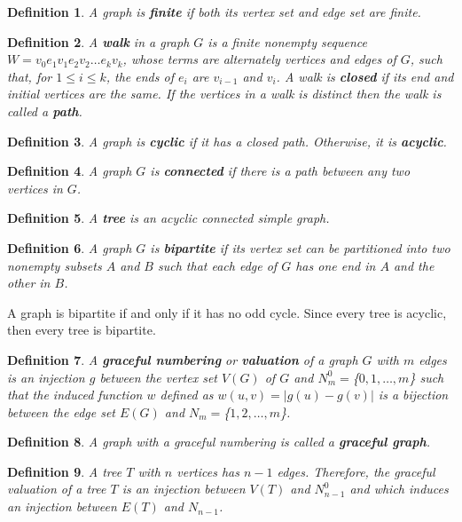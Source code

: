 \documentclass[a4paper, 11pt]{article}
\newtheorem{define}{Definition}
\begin{document}
\begin{define} A graph is \textbf{finite} if both its vertex set and edge set are finite.
\end{define}

\begin{define}
    A \textbf{walk} in a graph $G$ is a finite nonempty sequence $W=v_0 e_1 v_1 e_2 v_2 \dots e_k v_k$, whose terms are alternately vertices and edges of $G$, such that, for $1\leq i\leq k$, the ends of $e_i$ are $v_{i-1}$ and $v_i$. A walk is \textbf{closed} if its end and initial vertices are the same. If the vertices in a walk is distinct then the walk is called a \textbf{path}.
\end{define}

\begin{define} A graph is \textbf{cyclic} if it has a closed path. Otherwise, it is \textbf{acyclic}.
\end{define}

\begin{define} A graph $G$ is \textbf{connected} if there is a path between any two vertices in $G$.
\end{define}

\begin{define} A \textbf{tree} is an acyclic connected simple graph. 
\end{define}

\begin{define} A graph $G$ is \textbf{bipartite} if its vertex set can be partitioned into two nonempty subsets $A$ and $B$ such that each edge of $G$ has one end in $A$ and the other in $B$.
\end{define}
\indent
\indent A graph is bipartite if and only if it has no odd cycle. Since every tree is acyclic, then every tree is bipartite.


\begin{define} A \textbf{graceful numbering} or \textbf{valuation} of a graph $G$ with $m$ edges is an injection $g$ between the vertex set $V(G)$ of $G$ and $N_m^0=$\{$0,1,\dots,m$\} such that the induced function $w$ defined as $w(u,v)=|g(u)-g(v)|$ is a bijection between the edge set $E(G)$ and $N_m=$\{$1,2,\dots,m$\}.
\end{define}

\begin{define} A graph with a graceful numbering is called a \textbf{graceful graph}.
\end{define}

\begin{define} A tree $T$ with $n$ vertices has $n-1$ edges. Therefore, the graceful valuation of a tree $T$ is an injection between $V(T)$ and $N_{n-1}^0$ and which induces an injection between $E(T)$ and $N_{n-1}$.
\end{define}
\end{document}
